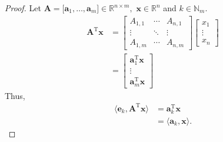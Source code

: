 \documentclass{article}
\theoremstyle{plain}
\begin{document}
\begin{proof}
	Let
	\begin{math}
		\bm{A} = \lbrack \bm{a}_1 , \ldots , \bm{a}_m \rbrack \in \mathbb{R}^{n \times m} ,
	\end{math}
	\begin{math}
		\bm{x} \in \mathbb{R}^n
	\end{math}
	and
	\begin{math}
		k \in \mathbb{N}_m .
	\end{math}
	\begin{equation*}
		\begin{split}
			\bm{A}^\mathrm{T} \bm{x} &=
			\begin{bmatrix}
				A_{1,1} & \cdots & A_{n,1} \\
				\vdots & \ddots & \vdots \\
				A_{1,m} & \cdots & A_{n,m}
			\end{bmatrix}
			\begin{bmatrix}
				x_1 \\
				\vdots \\
				x_n
			\end{bmatrix} \\
			&=
			\begin{bmatrix}
				\bm{a}_1^\mathrm{T} \bm{x} \\
				\vdots \\
				\bm{a}_m^\mathrm{T} \bm{x}
			\end{bmatrix}
		\end{split}
	\end{equation*}
	Thus,
	\begin{equation*}
		\begin{split}
			\langle \bm{e}_k , \bm{A}^\mathrm{T} \bm{x} \rangle 
			&= \bm{a}_k^\mathrm{T} \bm{x} \\
			&= \langle \bm{a}_k , \bm{x} \rangle .
		\end{split}
	\end{equation*}
\end{proof}
\end{document}
